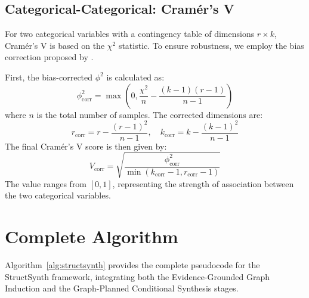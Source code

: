 \subsection{Categorical-Categorical: Cramér's V}
For two categorical variables with a contingency table of dimensions $r \times k$, Cramér's V is based on the $\chi^2$ statistic. To ensure robustness, we employ the bias correction proposed by \citet{bergsma2013bias}.

First, the bias-corrected $\phi^2$ is calculated as:
\begin{equation}
    \phi^2_{\text{corr}} = \max\left(0, \frac{\chi^2}{n} - \frac{(k-1)(r-1)}{n-1}\right)
\end{equation}
where $n$ is the total number of samples. The corrected dimensions are:
\begin{equation}
    r_{\text{corr}} = r - \frac{(r-1)^2}{n-1}, \quad k_{\text{corr}} = k - \frac{(k-1)^2}{n-1}
\end{equation}
The final Cramér's V score is then given by:
\begin{equation}
    V_{\text{corr}} = \sqrt{\frac{\phi^2_{\text{corr}}}{\min(k_{\text{corr}}-1, r_{\text{corr}}-1)}}
\end{equation}
The value ranges from $[0, 1]$, representing the strength of association between the two categorical variables.

\section{Complete Algorithm}
\label{sec:algorithm}
\label{app:algorithm}

Algorithm~\ref{alg:structsynth} provides the complete pseudocode for the \textsf{StructSynth} framework, integrating both the Evidence-Grounded Graph Induction and the Graph-Planned Conditional Synthesis stages.

